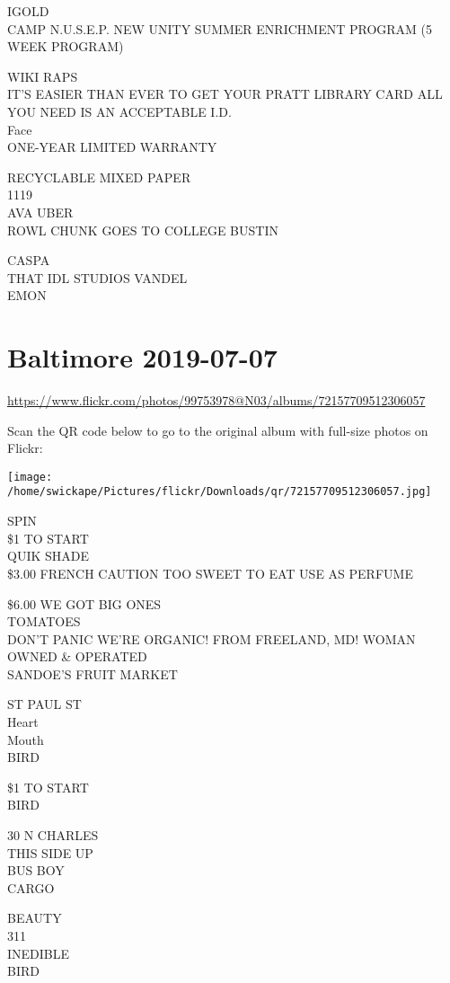 \documentclass[10pt,letterpaper]{article}
\begin{document}
IGOLD\\
CAMP N.U.S.E.P. NEW UNITY SUMMER ENRICHMENT PROGRAM (5 WEEK PROGRAM)

WIKI RAPS\\
IT'S EASIER THAN EVER TO GET YOUR PRATT LIBRARY CARD ALL YOU NEED IS AN ACCEPTABLE I.D.\\
Face\\
ONE{-}YEAR LIMITED WARRANTY

RECYCLABLE MIXED PAPER\\
1119\\
AVA UBER\\
ROWL CHUNK GOES TO COLLEGE BUSTIN

CASPA\\
THAT IDL STUDIOS VANDEL\\
EMON
\pagebreak

\section*{Baltimore 2019-07-07}

\url{https://www.flickr.com/photos/99753978@N03/albums/72157709512306057}

Scan the QR code below to go to the original album with full-size photos on Flickr:

\texttt{[image: /home/swickape/Pictures/flickr/Downloads/qr/72157709512306057.jpg]}
\pagebreak

SPIN\\
\$1 TO START\\
QUIK SHADE\\
\$3.00 FRENCH CAUTION TOO SWEET TO EAT USE AS PERFUME

\$6.00 WE GOT BIG ONES\\
TOMATOES\\
DON'T PANIC WE'RE ORGANIC!  FROM FREELAND, MD!  WOMAN OWNED \& OPERATED\\
SANDOE'S FRUIT MARKET

ST PAUL ST\\
Heart\\
Mouth\\
BIRD

\$1 TO START\\
BIRD

30 N CHARLES\\
THIS SIDE UP\\
BUS BOY\\
CARGO

BEAUTY\\
311\\
INEDIBLE\\
BIRD
\end{document}
